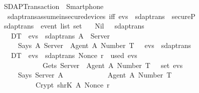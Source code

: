 %
\begin{isabellebody}%
  \isadelimtheory
  \isanewline
  \isanewline
  \endisadelimtheory
  \isatagtheory
  \isamarkupfalse%
  \ SDAP{\isacharunderscore}Transaction\ \ {\isachardoublequoteopen}{\isachardot}{\isacharslash}Smartphone{\isachardoublequoteclose}\isanewline
  \isanewline
  \endisatagtheory
  {\isafoldtheory}%
  \isadelimtheory
  \isanewline
  \endisadelimtheory
  \isanewline
  \isamarkupfalse%
  \ \isanewline
  \ \ sdaptrans{\isacharunderscore}assume{\isacharunderscore}insecure{\isacharunderscore}devices\ {\isacharbrackleft}iff{\isacharbrackright}{\isacharcolon}\ {\isachardoublequoteopen}evs\ {\isasymin}\ sdaptrans\ {\isasymLongrightarrow}\ secureP{\isachardoublequoteclose}%
  \isadelimdocument
  \endisadelimdocument
  \isatagdocument
  \isamarkuptrue%
  \endisatagdocument
  {\isafolddocument}%
  \isadelimdocument
  \endisadelimdocument
  \isamarkupfalse%
  \ sdaptrans\ {\isacharcolon}{\isacharcolon}\ {\isachardoublequoteopen}event\ list\ set{\isachardoublequoteclose}\ \isanewline
  \ \ Nil{\isacharcolon}\ {\isachardoublequoteopen}{\isacharbrackleft}{\isacharbrackright}\ {\isasymin}\ sdaptrans{\isachardoublequoteclose}\isanewline
  \isanewline
  \ \ {\isacharbar}\ DT{}{\isacharcolon}\ {\isachardoublequoteopen}{\isasymlbrakk}\ evs{}\ {\isasymin}\ sdaptrans{\isacharsemicolon}\ A\ {\isasymnoteq}\ Server\ {\isasymrbrakk}\isanewline
  \ \ \ \ {\isasymLongrightarrow}\ Says\ A\ Server\ {\isasymlbrace}\ Agent\ A{\isacharcomma}\ Number\ T\ {\isasymrbrace}\ {\isacharhash}\ evs{}\ {\isasymin}\ sdaptrans{\isachardoublequoteclose}\isanewline
  \isanewline
  \ \ {\isacharbar}\ DT{}{\isacharcolon}\ {\isachardoublequoteopen}{\isasymlbrakk}\ evs{}\ {\isasymin}\ sdaptrans{\isacharsemicolon}\ Nonce\ r\ {\isasymnotin}\ used\ evs{}{\isacharsemicolon}\isanewline
  \ \ \ \ \ \ \ \ \ \ \ \ Gets\ Server\ {\isasymlbrace}\ Agent\ A{\isacharcomma}\ Number\ T\ {\isasymrbrace}\ {\isasymin}\ set\ evs{}\ {\isasymrbrakk}\isanewline
  \ \ \ \ {\isasymLongrightarrow}\ Says\ Server\ A\ {\isasymlbrace}\ \isanewline
  \ \ \ \ \ \ \ \ \ \ {\isasymlbrace}Agent\ A{\isacharcomma}\ Number\ T{\isasymrbrace}{\isacharcomma}\isanewline
  \ \ \ \ \ \ \ \ \ \ Crypt\ {\isacharparenleft}shrK\ A{\isacharparenright}\ {\isacharparenleft}Nonce\ r{\isacharparenright}{\isacharcomma}\isanewline

\end{isabellebody}
